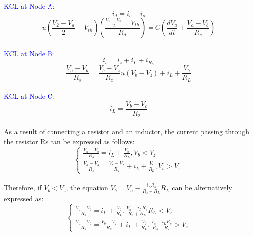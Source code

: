 \textcolor{blue}{KCL at Node A:}\\
\begin{equation}
    i_d=i_c+i_s
\end{equation}
\begin{equation}
    u(\frac{V_2-V_a}{2}-V_{th})(\frac{\frac{V_2-V_a}{2}-V_{th}}{R_d})=C(\frac{dV_a}{dt}+\frac{V_a-V_b}{R_s})
\end{equation}\\

\textcolor{blue}{KCL at Node B:}\\
\begin{equation}
    i_s=i_z+i_L+i_{R_L}
\end{equation}
\begin{equation}
    \frac{V_a-V_b}{R_s}=\frac{V_b-V_z}{R_z}u(V_b-V_z)+i_L+\frac{V_b}{R_L}
\end{equation}\\

\textcolor{blue}{KCL at Node C:}\\
\begin{equation}
    i_L=\frac{V_b-V_c}{R_2}
\end{equation}\\

As a result of connecting a resistor and an inductor, the current passing through the resistor Rs can be expressed as follows:\\

\begin{equation}
    \begin{cases}
        \frac{V_a-V_b}{R_s}=i_L+\frac{V_b}{R_L},  V_b<V_z\\
        \frac{V_a-V_b}{R_s}=\frac{V_b-V_z}{R_z}+i_L+\frac{V_b}{R_L},  V_b>V_z
    \end{cases}
\end{equation}\\

Therefore, if $V_b < V_z$, the equation $V_b = V_a - \frac{i_L R_s}{R_s+R_L} R_L$ can be alternatively expressed as:\\

\begin{equation}
    \begin{cases}
        \frac{V_a-V_b}{R_s}=i_L+\frac{V_b}{R_L},  \frac{V_a-i_LR_s}{R_s+R_L}R_L<V_z\\
        \frac{V_a-V_b}{R_s}=\frac{V_b-V_z}{R_z}+i_L+\frac{V_b}{R_L},  \frac{V_a-i_LR_s}{R_s+R_L}>V_z
    \end{cases}
\end{equation}\\

